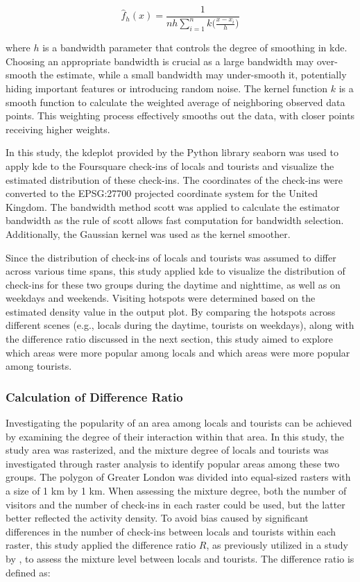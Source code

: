 \documentclass{article}
\theoremstyle{remark}
\begin{document}
\begin{equation} \label{eq:kde}
\hat{f}_{h}(x) = \frac{1}{nh \sum_{i=1}^n k\bigg(\frac{x-x_i}{h}\bigg)}
\end{equation}

where $h$ is a bandwidth parameter that controls the degree of smoothing in \acrshort{kde}. Choosing an appropriate bandwidth is crucial as a large bandwidth may over-smooth the estimate, while a small bandwidth may under-smooth it, potentially hiding important features or introducing random noise. The kernel function $k$ is a smooth function to calculate the weighted average of neighboring observed data points. This weighting process effectively smooths out the data, with closer points receiving higher weights.

In this study, the kdeplot provided by the Python library seaborn \citep{waskom_seaborn_2021} was used to apply \acrshort{kde} to the Foursquare check-ins of locals and tourists and visualize the estimated distribution of these check-ins. The coordinates of the check-ins were converted to the EPSG:27700 projected coordinate system for the United Kingdom. The bandwidth method scott was applied to calculate the estimator bandwidth as the rule of scott allows fast computation for bandwidth selection. Additionally, the Gaussian kernel was used as the kernel smoother.

Since the distribution of check-ins of locals and tourists was assumed to differ across various time spans, this study applied \acrshort{kde} to visualize the distribution of check-ins for these two groups during the daytime and nighttime, as well as on weekdays and weekends. Visiting hotspots were determined based on the estimated density value in the output plot. By comparing the hotspots across different scenes (e.g., locals during the daytime, tourists on weekdays), along with the difference ratio discussed in the next section, this study aimed to explore which areas were more popular among locals and which areas were more popular among tourists.


\subsubsection{Calculation of Difference Ratio}
Investigating the popularity of an area among locals and tourists can be achieved by examining the degree of their interaction within that area. In this study, the study area was rasterized, and the mixture degree of locals and tourists was investigated through raster analysis to identify popular areas among these two groups. The polygon of Greater London was divided into equal-sized rasters with a size of 1 km by 1 km. When assessing the mixture degree, both the number of visitors and the number of check-ins in each raster could be used, but the latter better reflected the activity density. To avoid bias caused by significant differences in the number of check-ins between locals and tourists within each raster, this study applied the difference ratio $R$, as previously utilized in a study by \cite{li_analyzing_2018}, to assess the mixture level between locals and tourists. The difference ratio is defined as:
\end{document}
